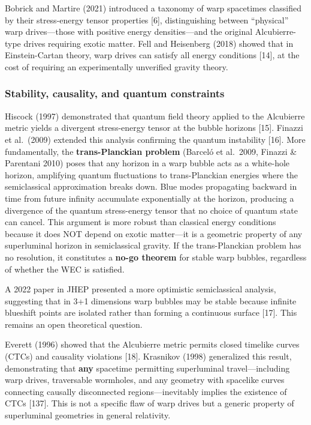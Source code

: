 \documentclass[11pt,a4paper,onecolumn]{article}
\begin{document}
Bobrick and Martire (2021) introduced a taxonomy of warp spacetimes classified by their stress-energy tensor properties [6], distinguishing between ``physical'' warp drives---those with positive energy densities---and the original Alcubierre-type drives requiring exotic matter. Fell and Heisenberg (2018) showed that in Einstein-Cartan theory, warp drives can satisfy all energy conditions [14], at the cost of requiring an experimentally unverified gravity theory.

\subsubsection{Stability, causality, and quantum constraints}

Hiscock (1997) demonstrated that quantum field theory applied to the Alcubierre metric yields a divergent stress-energy tensor at the bubble horizons [15]. Finazzi et al.\ (2009) extended this analysis confirming the quantum instability [16]. More fundamentally, the \textbf{trans-Planckian problem} (Barcel\'{o} et al.\ 2009, Finazzi \& Parentani 2010) poses that any horizon in a warp bubble acts as a white-hole horizon, amplifying quantum fluctuations to trans-Planckian energies where the semiclassical approximation breaks down. Blue modes propagating backward in time from future infinity accumulate exponentially at the horizon, producing a divergence of the quantum stress-energy tensor that no choice of quantum state can cancel. This argument is more robust than classical energy conditions because it does NOT depend on exotic matter---it is a geometric property of any superluminal horizon in semiclassical gravity. If the trans-Planckian problem has no resolution, it constitutes a \textbf{no-go theorem} for stable warp bubbles, regardless of whether the WEC is satisfied.

A 2022 paper in JHEP presented a more optimistic semiclassical analysis, suggesting that in 3+1 dimensions warp bubbles may be stable because infinite blueshift points are isolated rather than forming a continuous surface [17]. This remains an open theoretical question.

Everett (1996) showed that the Alcubierre metric permits closed timelike curves (CTCs) and causality violations [18]. Krasnikov (1998) generalized this result, demonstrating that \textbf{any} spacetime permitting superluminal travel---including warp drives, traversable wormholes, and any geometry with spacelike curves connecting causally disconnected regions---inevitably implies the existence of CTCs [137]. This is not a specific flaw of warp drives but a generic property of superluminal geometries in general relativity.
\end{document}
